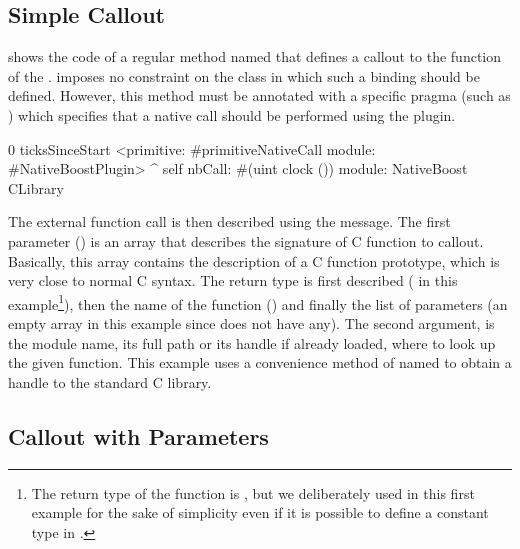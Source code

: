 \subsection{Simple Callout}

 shows the code of a regular \ST method named  that defines a callout to the  function of the .
\NB imposes no constraint on the class in which such a binding should be defined.
However, this method must be annotated with a specific pragma (such as ) which specifies that a native call should be performed using the \NB plugin.

\begin{stcode}[
	label={lst:ffi-clock},
	caption={\NBFFI example of callout declaration to the \ttt{clock} function of the \ttt{libc}}]{0}
ticksSinceStart
	<primitive: #primitiveNativeCall
	 module: #NativeBoostPlugin>
	^ self
		nbCall: #(uint clock ())
		module: NativeBoost CLibrary
\end{stcode}

The external function call is then described using the  message.
The first parameter () is an array that describes the signature of C function to callout.
Basically, this array contains the description of a C function prototype, which is very close to normal C syntax.
The return type is first described ( in this example\footnote{The return type of the  function is , but we deliberately used  in this first example for the sake of simplicity even if it is possible to define a constant type in \NB.}), then the name of the function () and finally the list of parameters (an empty array in this example since  does not have any).
The second argument,  is the module name, its full path or its handle if already loaded, where to look up the given function.
This example uses a convenience method of \NB named  to obtain a handle to the standard C library.

\subsection{Callout with Parameters}

